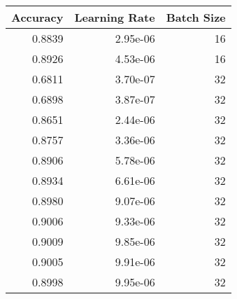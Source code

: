 \begin{tabular}{rrr}
\toprule
Accuracy & Learning Rate & Batch Size \\
\midrule
0.8839 & 2.95e-06 & 16 \\
0.8926 & 4.53e-06 & 16 \\
0.6811 & 3.70e-07 & 32 \\
0.6898 & 3.87e-07 & 32 \\
0.8651 & 2.44e-06 & 32 \\
0.8757 & 3.36e-06 & 32 \\
0.8906 & 5.78e-06 & 32 \\
0.8934 & 6.61e-06 & 32 \\
0.8980 & 9.07e-06 & 32 \\
0.9006 & 9.33e-06 & 32 \\
0.9009 & 9.85e-06 & 32 \\
0.9005 & 9.91e-06 & 32 \\
0.8998 & 9.95e-06 & 32 \\
\bottomrule
\end{tabular}
